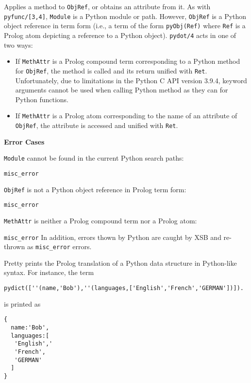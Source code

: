 \begin{description}
%
Applies a method to {\tt ObjRef}, or obtains an attribute from it.  As
with {\tt pyfunc/[3,4]}, {\tt Module} is a Python module or
path. However, {\tt ObjRef} is a Python object reference in term form
(i.e., a term of the form {\tt pyObj(Ref)} where {\tt Ref} is a Prolog
atom depicting a reference to a Python object). {\tt pydot/4} acts in
one of two ways:
\begin{itemize}
\item If {\tt MethAttr} is a Prolog compound term corresponding to a
  Python method for {\tt ObjRef}, the method is called and its return
  unified with {\tt Ret}.  Unfortunately, due to limitations in the
  Python C API version 3.9.4, keyword arguments cannot be used when
  calling Python method as they can for Python functions.
%
\item If {\tt MethAttr} is a Prolog atom corresponding to the name of
  an attribute of {\tt ObjRef}, the attribute is accessed and unified
  with {\tt Ret}.
\end{itemize}

{\bf Error Cases}
\bi
\item {\tt Module} cannot be found in the current Python search paths:
\bi
\item {\tt misc\_error}
\ei
\item {\tt ObjRef} is not a Python object reference in Prolog term form:
\bi
\item {\tt misc\_error}
\ei
\item {\tt MethAttr} is neither a Prolog compound term nor a Prolog atom:
\bi
\item {\tt misc\_error}
  \ei \ei In addition, errors thown by Python are
  caught by XSB and re-thrown as {\tt misc\_error} errors.

%
Pretty prints the Prolog translation of a Python data structure in
Python-like syntax.  For instance, the term

\begin{verbatim}
pydict([''(name,'Bob'),''(languages,['English','French','GERMAN'])]).
\end{verbatim}

\noindent
is printed as 
\begin{verbatim}
{
  name:'Bob',
  languages:[
   'English','
   'French',
   'GERMAN'
  ]
} 
\end{verbatim}


\end{description}
